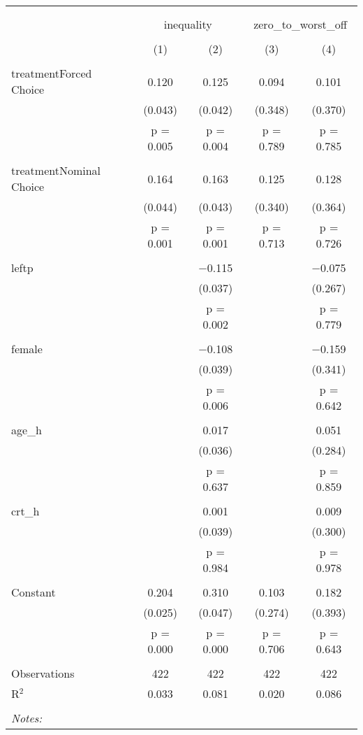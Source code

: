 
\begin{table}[!htbp] \centering 
  \caption{} 
  \label{tbl:tweak1} 
\begin{tabular}{@{\extracolsep{5pt}}lcccc} 
\\[-1.8ex]\hline 
\hline \\[-1.8ex] 
\\[-1.8ex] & \multicolumn{2}{c}{inequality} & \multicolumn{2}{c}{zero\_to\_worst\_off} \\ 
\\[-1.8ex] & (1) & (2) & (3) & (4)\\ 
\hline \\[-1.8ex] 
 treatmentForced Choice & 0.120 & 0.125 & 0.094 & 0.101 \\ 
  & (0.043) & (0.042) & (0.348) & (0.370) \\ 
  & p = 0.005 & p = 0.004 & p = 0.789 & p = 0.785 \\ 
  & & & & \\ 
 treatmentNominal Choice & 0.164 & 0.163 & 0.125 & 0.128 \\ 
  & (0.044) & (0.043) & (0.340) & (0.364) \\ 
  & p = 0.001 & p = 0.001 & p = 0.713 & p = 0.726 \\ 
  & & & & \\ 
 leftp &  & $-$0.115 &  & $-$0.075 \\ 
  &  & (0.037) &  & (0.267) \\ 
  &  & p = 0.002 &  & p = 0.779 \\ 
  & & & & \\ 
 female &  & $-$0.108 &  & $-$0.159 \\ 
  &  & (0.039) &  & (0.341) \\ 
  &  & p = 0.006 &  & p = 0.642 \\ 
  & & & & \\ 
 age\_h &  & 0.017 &  & 0.051 \\ 
  &  & (0.036) &  & (0.284) \\ 
  &  & p = 0.637 &  & p = 0.859 \\ 
  & & & & \\ 
 crt\_h &  & 0.001 &  & 0.009 \\ 
  &  & (0.039) &  & (0.300) \\ 
  &  & p = 0.984 &  & p = 0.978 \\ 
  & & & & \\ 
 Constant & 0.204 & 0.310 & 0.103 & 0.182 \\ 
  & (0.025) & (0.047) & (0.274) & (0.393) \\ 
  & p = 0.000 & p = 0.000 & p = 0.706 & p = 0.643 \\ 
  & & & & \\ 
Observations & 422 & 422 & 422 & 422 \\ 
R$^{2}$ & 0.033 & 0.081 & 0.020 & 0.086 \\ 
\hline \\[-1.8ex] 
\textit{Notes:} & \multicolumn{4}{l}{} \\ 
\end{tabular} 
\end{table}  
